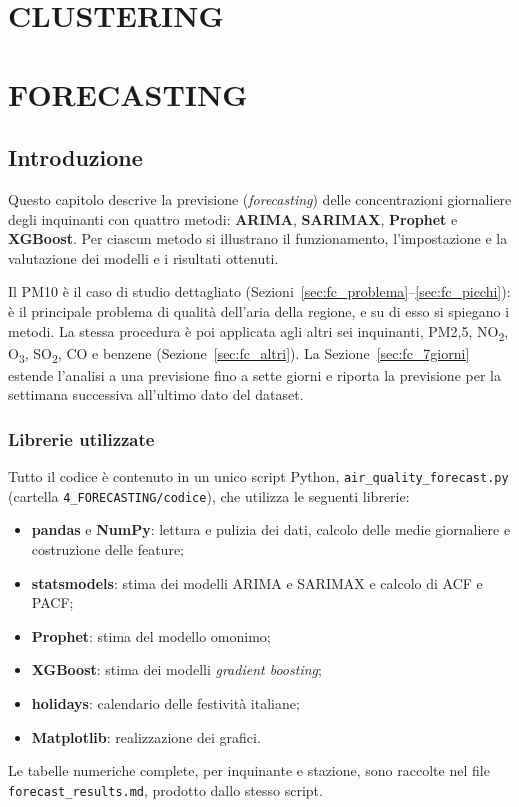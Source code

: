 \documentclass[11pt]{report}
\begin{document}
\chapter{CLUSTERING}

\chapter{FORECASTING}
\label{cap:forecasting}

\section{Introduzione}
\label{sec:fc_intro}

Questo capitolo descrive la previsione (\emph{forecasting}) delle concentrazioni
giornaliere degli inquinanti con quattro metodi: \textbf{ARIMA}, \textbf{SARIMAX},
\textbf{Prophet} e \textbf{XGBoost}. Per ciascun metodo si illustrano il
funzionamento, l'impostazione e la valutazione dei modelli e i risultati ottenuti.

Il PM10 è il caso di studio dettagliato
(Sezioni~\ref{sec:fc_problema}--\ref{sec:fc_picchi}): è il principale problema di
qualità dell'aria della regione, e su di esso si spiegano i metodi. La stessa
procedura è poi applicata agli altri sei inquinanti, PM2,5, NO\textsubscript{2},
O\textsubscript{3}, SO\textsubscript{2}, CO e benzene
(Sezione~\ref{sec:fc_altri}). La Sezione~\ref{sec:fc_7giorni} estende l'analisi a
una previsione fino a sette giorni e riporta la previsione per la settimana
successiva all'ultimo dato del dataset.

\subsection{Librerie utilizzate}
Tutto il codice è contenuto in un unico script Python,
\texttt{air\_quality\_forecast.py} (cartella \texttt{4\_FORECASTING/codice}), che
utilizza le seguenti librerie:
\begin{itemize}
  \item \textbf{pandas} e \textbf{NumPy}: lettura e pulizia dei dati, calcolo
        delle medie giornaliere e costruzione delle feature;
  \item \textbf{statsmodels}: stima dei modelli ARIMA e SARIMAX e calcolo di
        ACF e PACF;
  \item \textbf{Prophet}: stima del modello omonimo;
  \item \textbf{XGBoost}: stima dei modelli \emph{gradient boosting};
  \item \textbf{holidays}: calendario delle festività italiane;
  \item \textbf{Matplotlib}: realizzazione dei grafici.
\end{itemize}
Le tabelle numeriche complete, per inquinante e stazione, sono raccolte nel file
\texttt{forecast\_results.md}, prodotto dallo stesso script.
\end{document}
